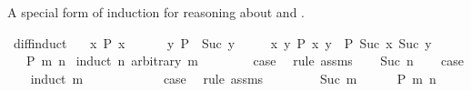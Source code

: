 \begin{isabellebody}
%
\begin{isamarkuptext}%
A special form of induction for reasoning about  and .%
\end{isamarkuptext}\isamarkuptrue%
\isamarkupfalse%
\ diff{\isacharunderscore}{\kern0pt}induct{\isacharcolon}{\kern0pt}\isanewline
\ \ \ {\isachardoublequoteopen}{\isasymAnd}x{\isachardot}{\kern0pt}\ P\ x\ {}{\isachardoublequoteclose}\isanewline
\ \ \ \ \ {\isachardoublequoteopen}{\isasymAnd}y{\isachardot}{\kern0pt}\ P\ {}\ {\isacharparenleft}{\kern0pt}Suc\ y{\isacharparenright}{\kern0pt}{\isachardoublequoteclose}\isanewline
\ \ \ \ \ {\isachardoublequoteopen}{\isasymAnd}x\ y{\isachardot}{\kern0pt}\ P\ x\ y\ {\isasymLongrightarrow}\ P\ {\isacharparenleft}{\kern0pt}Suc\ x{\isacharparenright}{\kern0pt}\ {\isacharparenleft}{\kern0pt}Suc\ y{\isacharparenright}{\kern0pt}{\isachardoublequoteclose}\isanewline
\ \ \ {\isachardoublequoteopen}P\ m\ n{\isachardoublequoteclose}\isanewline
%
\isadelimproof
%
\endisadelimproof
%
\isatagproof
{}\isamarkupfalse%
\ {\isacharparenleft}{\kern0pt}induct\ n\ arbitrary{\isacharcolon}{\kern0pt}\ m{\isacharparenright}{\kern0pt}\isanewline
\ \ \isamarkupfalse%
\ {}\isanewline
\ \ \isamarkupfalse%
\ {\isacharquery}{\kern0pt}case\ \isamarkupfalse%
\ {\isacharparenleft}{\kern0pt}rule\ assms{\isacharparenleft}{\kern0pt}{}{\isacharparenright}{\kern0pt}{\isacharparenright}{\kern0pt}\isanewline
{}\isamarkupfalse%
\isanewline
\ \ \isamarkupfalse%
\ {\isacharparenleft}{\kern0pt}Suc\ n{\isacharparenright}{\kern0pt}\isanewline
\ \ \isamarkupfalse%
\ {\isacharquery}{\kern0pt}case\isanewline
\ \ \isamarkupfalse%
\ {\isacharparenleft}{\kern0pt}induct\ m{\isacharparenright}{\kern0pt}\isanewline
\ \ \ \ \isamarkupfalse%
\ {}\isanewline
\ \ \ \ \isamarkupfalse%
\ {\isacharquery}{\kern0pt}case\ \isamarkupfalse%
\ {\isacharparenleft}{\kern0pt}rule\ assms{\isacharparenleft}{\kern0pt}{}{\isacharparenright}{\kern0pt}{\isacharparenright}{\kern0pt}\isanewline
\ \ \isamarkupfalse%
\isanewline
\ \ \ \ \isamarkupfalse%
\ {\isacharparenleft}{\kern0pt}Suc\ m{\isacharparenright}{\kern0pt}\isanewline
\ \ \ \ \isamarkupfalse%
\ {\isacartoucheopen}P\ m\ n{\isacartoucheclose}\ \isamarkupfalse%

\end{isabellebody}
